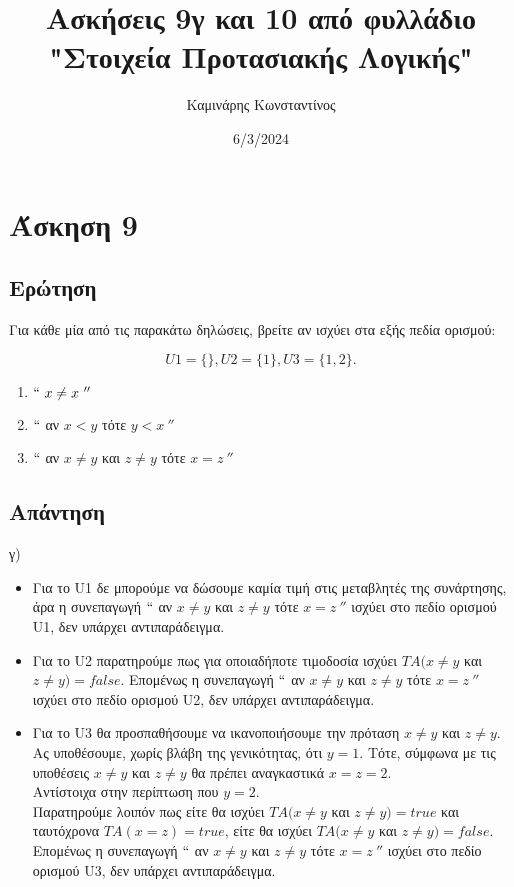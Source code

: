 \documentclass{article}
\title{Ασκήσεις 9γ και 10 από φυλλάδιο \\"Στοιχεία Προτασιακής Λογικής"}
\author{Καμινάρης Κωνσταντίνος}
\date{6/3/2024}
\begin{document}

\maketitle

\section*{Άσκηση 9}
\subsection*{Ερώτηση}
Για κάθε μία από τις παρακάτω δηλώσεις, βρείτε αν ισχύει στα εξής πεδία ορισμού:

\[U1 = \{ \} , U2 = \{1\} , U3 = \{1, 2\} .\]

\begin{enumerate}[label=\alph*)]
    \item $``\ x \neq x\ ''$
    \item $``$ αν $x \less y$ τότε $y \less x\ ''$
    \item $``$ αν $x \neq y$ και $z \neq y$ τότε $x=z\ ''$
\end{enumerate}

\subsection*{Απάντηση}

γ) 
\begin{itemize}
    \item Για το U1 δε μπορούμε να δώσουμε καμία τιμή στις μεταβλητές της συνάρτησης, άρα η συνεπαγωγή $``$ αν $x \neq y$ και $z \neq y$ τότε $x=z\ ''$ ισχύει στο πεδίο ορισμού U1, δεν υπάρχει αντιπαράδειγμα.
    \item Για το U2 παρατηρούμε πως για οποιαδήποτε τιμοδοσία ισχύει $TA(x \neq y$ και $z \neq y) = false$. Επομένως η συνεπαγωγή $``$ αν $x \neq y$ και $z \neq y$ τότε $x=z\ ''$ ισχύει στο πεδίο ορισμού U2, δεν υπάρχει αντιπαράδειγμα.
    \item Για το U3 θα προσπαθήσουμε να ικανοποιήσουμε την πρόταση $x \neq y$ και $z \neq y$.\\
    Ας υποθέσουμε, χωρίς βλάβη της γενικότητας, ότι $y=1$. Τότε, σύμφωνα με τις υποθέσεις $x \neq y$ και $z \neq y$ θα πρέπει αναγκαστικά $x=z=2$.\\
    Αντίστοιχα στην περίπτωση που $y=2$.\\
    Παρατηρούμε λοιπόν πως είτε θα ισχύει $ΤΑ(x \neq y$ και $z \neq y) = true$ και ταυτόχρονα $TA(x=z) = true$, είτε θα ισχύει $ΤΑ(x \neq y$ και $z \neq y) = false$. Επομένως η συνεπαγωγή $``$ αν $x \neq y$ και $z \neq y$ τότε $x=z\ ''$ ισχύει στο πεδίο ορισμού U3, δεν υπάρχει αντιπαράδειγμα.
\end{itemize}
\end{document}
